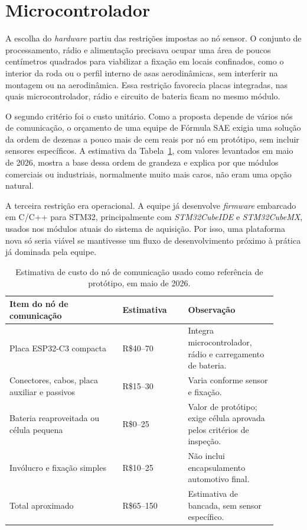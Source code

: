 \section{Microcontrolador}

A escolha do \emph{hardware} partiu das restrições impostas ao nó sensor. O conjunto de processamento, rádio e alimentação precisava ocupar uma área de poucos centímetros quadrados para viabilizar a fixação em locais confinados, como o interior da roda ou o perfil interno de asas aerodinâmicas, sem interferir na montagem ou na aerodinâmica. Essa restrição favorecia placas integradas, nas quais microcontrolador, rádio e circuito de bateria ficam no mesmo módulo.

O segundo critério foi o custo unitário. Como a proposta depende de vários nós de comunicação, o orçamento de uma equipe de Fórmula SAE exigia uma solução da ordem de dezenas a pouco mais de cem reais por nó em protótipo, sem incluir sensores específicos. A estimativa da Tabela~\ref{tab:bom-no-sensor}, com valores levantados em maio de 2026, mostra a base dessa ordem de grandeza e explica por que módulos comerciais ou industriais, normalmente muito mais caros, não eram uma opção natural.

A terceira restrição era operacional. A equipe já desenvolve \emph{firmware} embarcado em C/C++ para STM32, principalmente com \emph{STM32CubeIDE} e \emph{STM32CubeMX}, usados nos módulos atuais do sistema de aquisição. Por isso, uma plataforma nova só seria viável se mantivesse um fluxo de desenvolvimento próximo à prática já dominada pela equipe.

\begin{table}[htbp]
\centering
\small
\setlength{\tabcolsep}{5pt}
\renewcommand{\arraystretch}{1.12}
\begin{tabular}{p{0.38\linewidth}|p{0.22\linewidth}|p{0.30\linewidth}}
\hline
Item do nó de comunicação & Estimativa & Observação \\
\hline
Placa ESP32-C3 compacta & R\$40--70 & Integra microcontrolador, rádio e carregamento de bateria. \\
\hline
Conectores, cabos, placa auxiliar e passivos & R\$15--30 & Varia conforme sensor e fixação. \\
\hline
Bateria reaproveitada ou célula pequena & R\$0--25 & Valor de protótipo; exige célula aprovada pelos critérios de inspeção. \\
\hline
Invólucro e fixação simples & R\$10--25 & Não inclui encapsulamento automotivo final. \\
\hline
Total aproximado & R\$65--150 & Estimativa de bancada, sem sensor específico. \\
\hline
\end{tabular}
\caption{Estimativa de custo do nó de comunicação usado como referência de protótipo, em maio de 2026.}
\label{tab:bom-no-sensor}
\end{table}

